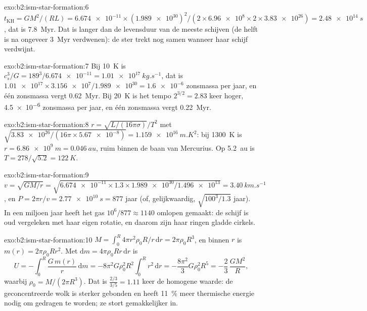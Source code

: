 \begin{solution}{exo:b2:ism-star-formation:6}
$t_{\mathrm{KH}} = GM^2/(RL) = \num{6.674e-11}\times(\num{1.989e30})^2/(2\times
\num{6.96e8}\times2\times\num{3.83e26}) = \qty{2.48e14}{s}$, dat is
\qty{7.8}{Myr}. Dat is langer dan de levensduur van de meeste schijven (de helft is na
ongeveer \qty{3}{Myr} verdwenen): de ster trekt nog samen wanneer haar schijf verdwijnt.
\end{solution}

\begin{solution}{exo:b2:ism-star-formation:7}
Bij \qty{10}{K} is $c_s^3/G = 189^3/\num{6.674e-11} = \qty{1.01e17}{kg.s^{-1}}$, dat is
$\num{1.01e17}\times\num{3.156e7}/\num{1.989e30} = \num{1.6e-6}$ zonsmassa per
jaar, en één zonsmassa vergt \qty{0.62}{Myr}. Bij \qty{20}{K} is het tempo
$2^{3/2} = 2.83$ keer hoger, \num{4.5e-6} zonsmassa per jaar, en één zonsmassa
vergt \qty{0.22}{Myr}.
\end{solution}

\begin{solution}{exo:b2:ism-star-formation:8}
$r = \sqrt{L/(16\pi\sigma)}/T^2$ met $\sqrt{\num{3.83e26}/(16\pi\times\num{5.67e-8})}
= \qty{1.159e16}{m.K^2}$: bij \qty{1300}{K} is $r = \qty{6.86e9}{m} = \qty{0.046}{au}$,
ruim binnen de baan van Mercurius. Op \qty{5.2}{au} is $T = 278/\sqrt{5.2} = \qty{122}{K}$.
\end{solution}

\begin{solution}{exo:b2:ism-star-formation:9}
$v = \sqrt{GM/r} = \sqrt{\num{6.674e-11}\times1.3\times\num{1.989e30}/\num{1.496e13}}
= \qty{3.40}{km.s^{-1}}$, en $P = 2\pi r/v = \qty{2.77e10}{s} = 877$ jaar
(of, gelijkwaardig, $\sqrt{100^3/1.3}$ jaar). In een miljoen jaar heeft het gas
$10^6/877 \approx \num{1140}$ omlopen gemaakt: de schijf is oud vergeleken met haar eigen rotatie,
en daarom zijn haar ringen gladde cirkels.
\end{solution}

\begin{solution}{exo:b2:ism-star-formation:10}
$M = \int_0^R 4\pi r^2\rho_0R/r\,\mathrm dr = 2\pi\rho_0R^3$, en binnen $r$ is
$m(r) = 2\pi\rho_0Rr^2$. Met $\mathrm dm = 4\pi\rho_0Rr\,\mathrm dr$ is
\[
  U = -\int_0^R \frac{G\,m(r)}{r}\,\mathrm dm
    = -8\pi^2G\rho_0^2R^2\int_0^R r^2\,\mathrm dr = -\frac{8\pi^2}{3}G\rho_0^2R^5
    = -\frac23\,\frac{GM^2}{R},
\]
waarbij $\rho_0 = M/(2\pi R^3)$. Dat is $\tfrac{2/3}{3/5} = 1.11$ keer de homogene waarde:
de geconcentreerde wolk is sterker gebonden en heeft \qty{11}{\percent} meer
thermische energie nodig om gedragen te worden; ze stort gemakkelijker in.
\end{solution}

